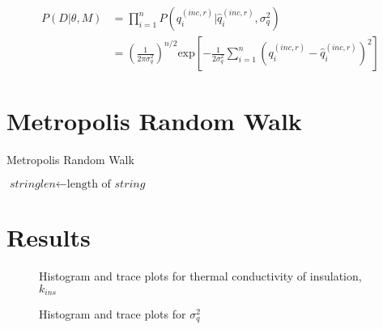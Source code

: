 \documentclass[article]{proc}
\makeatletter
\def\BState{\State\hskip-\ALG@thistlm}
\makeatother
\begin{document}
\begin{align}\label{eq:likelihood_2}
    P(D| \theta, M) &= \prod_{i=1}^n P(q_i^{(inc,r)}| \hat{q}_i^{(inc,r)}, \sigma_q^2) \\
    &= \left(\frac{1}{2 \pi \sigma_q^2} \right)^{n/2} \text{exp} \left[-\frac{1}{2 \sigma_q^2} \sum_{i=1}^n \left(q_i^{(inc,r)} - \hat{q}_i^{(inc,r)} \right)^2 \right]
\end{align}

\section{Metropolis Random Walk}

\begin{algorithm}
\caption{Metropolis Random Walk}\label{euclid}
\begin{algorithmic}[1]

\State $\textit{stringlen} \gets \text{length of }\textit{string}$
\end{algorithmic}
\end{algorithm}

\section{Results}

\begin{figure}[b!]
    \centering
    \qquad
    \caption{Histogram and trace plots for thermal conductivity of insulation, $k_{ins}$}
    \label{fig:param_trace}
\end{figure}

\begin{figure}[b!]
    \centering
    \qquad
    \caption{Histogram and trace plots for $\sigma_q^2$}
    \label{fig:sigma_trace}
\end{figure}
\end{document}
